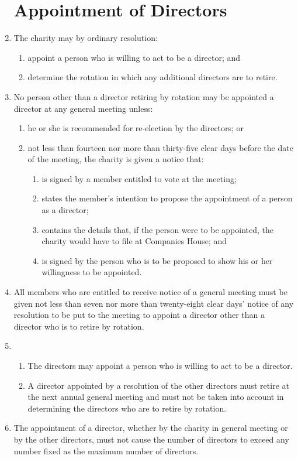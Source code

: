 \begin{enumerate}
\section{Appointment of Directors}

\item
  The charity may by ordinary resolution:
  \begin{enumerate}
  \item
    appoint a person who is willing to act to be a director; and
  \item
    determine the rotation in which any additional directors are to
    retire.
  \end{enumerate}

\item
  No person other than a director retiring by rotation may be
  appointed a director at any general meeting unless:
  \begin{enumerate}
  \item
    he or she is recommended for re-election by the directors; or
  \item
    not less than fourteen nor more than thirty-five clear days before
    the date of the meeting, the charity is given a notice that:
    \begin{enumerate}
    \item
      is signed by a member entitled to vote at the meeting;
    \item
      states the member's intention to propose the appointment of a
      person as a director;
    \item
      contains the details that, if the person were to be appointed, the
      charity would have to file at Companies House; and
    \item
      is signed by the person who is to be proposed to show his or her
      willingness to be appointed.
    \end{enumerate}
  \end{enumerate}
\item
  All members who are entitled to receive notice of a general meeting
  must be given not less than seven nor more than twenty-eight clear
  days' notice of any resolution to be put to the meeting to appoint
  a director other than a director who is to retire by rotation.

\item
  \begin{enumerate}
  \item
    The directors may appoint a person who is willing to act to be a
    director.
  \item
    A director appointed by a resolution of the other directors must
    retire at the next annual general meeting and must not be taken
    into account in determining the directors who are to retire by
    rotation.
  \end{enumerate}
\item
  The appointment of a director, whether by the charity in general
  meeting or by the other directors, must not cause the number of
  directors to exceed any number fixed as the maximum number of
  directors.


\end{enumerate}
